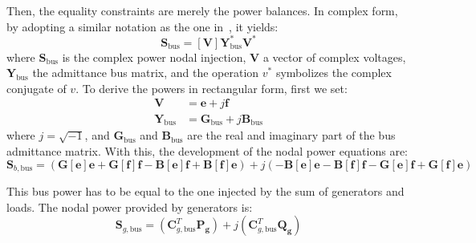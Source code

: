 \documentclass{article}
\begin{document}
Then, the equality constraints are merely the power balances. In complex form, by adopting a similar notation as the one in~\cite{zimmerman2016matpower}, it yields: 
\begin{equation}
    \bm{S}_\text{bus} = [\bm{V}]\bm{Y}^*_\text{bus}\bm{V}^*
    \label{eq:sbus}
\end{equation}
where $\bm{S}_\text{bus}$ is the complex power nodal injection, $\bm{V}$ a vector of complex voltages, $\bm{Y}_\text{bus}$ the admittance bus matrix, and the operation $v^*$ symbolizes the complex conjugate of $v$. To derive the powers in rectangular form, first we set:
\begin{align}
    \bm{V} &= \bm{e} + j\bm{f} \\
    \bm{Y}_\text{bus} &= \bm{G}_\text{bus} + j\bm{B}_\text{bus}
\end{align}
where $j=\sqrt{-1}$, and $\bm{G}_\text{bus}$ and $\bm{B}_\text{bus}$ are the real and imaginary part of the bus admittance matrix. With this, the development of the nodal power equations are:
\begin{equation}
    \bm{S}_{b,\text{bus}} = (\bm{G}[\bm{e}]\bm{e} + \bm{G}[\bm{f}]\bm{f} - \bm{B}[\bm{e}]\bm{f} + \bm{B}[\bm{f}]\bm{e}) + j(-\bm{B}[\bm{e}]\bm{e} - \bm{B}[\bm{f}]\bm{f} - \bm{G}[\bm{e}]\bm{f} + \bm{G}[\bm{f}]\bm{e})
\end{equation}

This bus power has to be equal to the one injected by the sum of generators and loads. The nodal power provided by generators is:
\begin{equation}
    \bm{S}_{g,\text{bus}} = (\bm{C}_{g,\text{bus}}^T \bm{P_g}) + j(\bm{C}_{g,\text{bus}}^T \bm{Q_g})
\end{equation}
\end{document}
